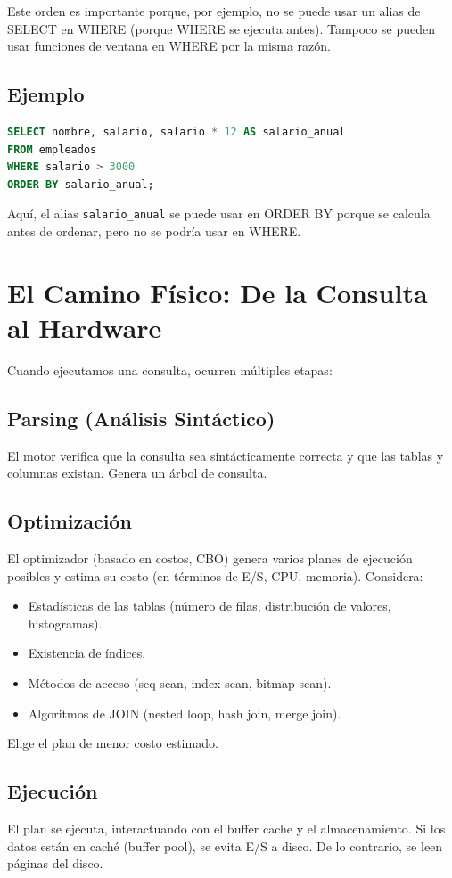 \documentclass[12pt,a4paper,openany,oneside]{book}
\begin{document}
Este orden es importante porque, por ejemplo, no se puede usar un alias de SELECT en WHERE (porque WHERE se ejecuta antes). Tampoco se pueden usar funciones de ventana en WHERE por la misma razón.

\subsection{Ejemplo}
\begin{lstlisting}[language=SQL]
SELECT nombre, salario, salario * 12 AS salario_anual
FROM empleados
WHERE salario > 3000
ORDER BY salario_anual;
\end{lstlisting}
Aquí, el alias \texttt{salario\_anual} se puede usar en ORDER BY porque se calcula antes de ordenar, pero no se podría usar en WHERE.

\section{El Camino Físico: De la Consulta al Hardware}
Cuando ejecutamos una consulta, ocurren múltiples etapas:

\subsection{Parsing (Análisis Sintáctico)}
El motor verifica que la consulta sea sintácticamente correcta y que las tablas y columnas existan. Genera un árbol de consulta.

\subsection{Optimización}
El optimizador (basado en costos, CBO) genera varios planes de ejecución posibles y estima su costo (en términos de E/S, CPU, memoria). Considera:
\begin{itemize}
    \item Estadísticas de las tablas (número de filas, distribución de valores, histogramas).
    \item Existencia de índices.
    \item Métodos de acceso (seq scan, index scan, bitmap scan).
    \item Algoritmos de JOIN (nested loop, hash join, merge join).
\end{itemize}
Elige el plan de menor costo estimado.

\subsection{Ejecución}
El plan se ejecuta, interactuando con el buffer cache y el almacenamiento. Si los datos están en caché (buffer pool), se evita E/S a disco. De lo contrario, se leen páginas del disco.
\end{document}
